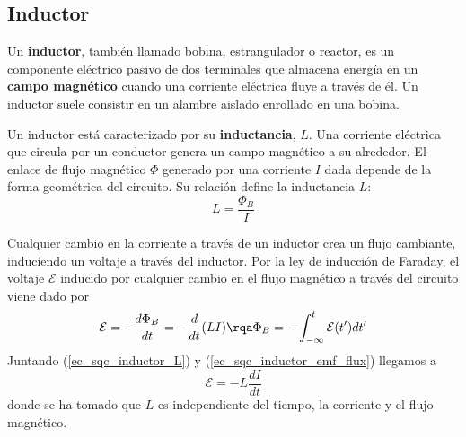     \subsection{Inductor}  \label{sec_sqc_inductor}

    Un \textbf{inductor}, también llamado bobina, estrangulador o reactor, es un componente eléctrico pasivo de dos terminales que almacena energía en un \textbf{campo magnético} cuando una corriente eléctrica fluye a través de él. Un inductor suele consistir en un alambre aislado enrollado en una bobina.


    Un inductor está caracterizado por su \textbf{inductancia}, $L$. Una corriente eléctrica que circula por un conductor genera un campo magnético a su alrededor. El enlace de flujo magnético $\Phi$ generado por una corriente $I$ dada depende de la forma geométrica del circuito. Su relación define la inductancia $L$:
    \begin{equation} \label{ec_sqc_inductor_L}
        L = \frac{\Phi_B}{I}
    \end{equation}
    
    Cualquier cambio en la corriente a través de un inductor crea un flujo cambiante, induciendo un voltaje a través del inductor. Por la ley de inducción de Faraday, el voltaje $\mathcal {E}$ inducido por cualquier cambio en el flujo magnético a través del circuito viene dado por
    \begin{equation} \label{ec_sqc_inductor_emf_flux}
        \mathcal{E} = - \frac{d \Phi_B}{dt} = - \frac{d}{dt}(LI) 
        \rqa 
        \Phi_B = - \int_{-\infty}^t \mathcal{E}(t')  dt'
    \end{equation}
    Juntando (\ref{ec_sqc_inductor_L}) y (\ref{ec_sqc_inductor_emf_flux}) llegamos a
    \begin{equation} \label{ec_sqc_inductor_emf_flux}
        \mathcal{E} = - L \frac{d I}{dt}
    \end{equation}
    donde se ha tomado que $L$ es independiente del tiempo, la corriente y el flujo magnético. 

